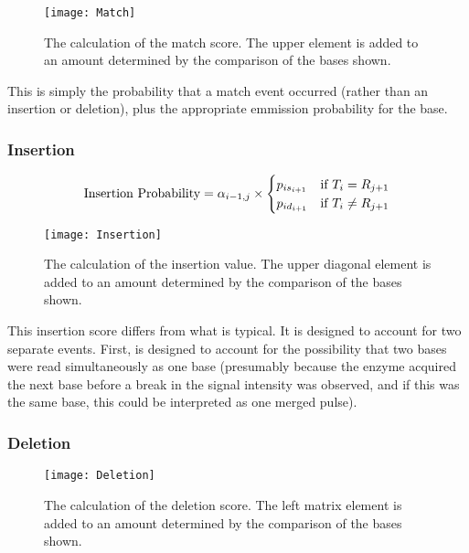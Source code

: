 \documentclass[fleqn,10pt]{SelfArx} %
\begin{document}
\begin{figure}[ht] %
	\texttt{[image: Match]}
		\caption{The calculation of the match score.  The upper element is added to an amount determined by the comparison of the bases shown.}
\end{figure}

This is simply the probability that a match event occurred (rather than an insertion or deletion), plus the appropriate emmission probability for the base.

\subsubsection{\textbf{Insertion}}


\begin{dmath}
\text{Insertion Probability} = \\
	\alpha_{i-1,j}  \times 
	\begin{cases}
		p_{is_{i+1}}  & \text{if }  T_{i} = R_{j+1} \\
		p_{id_{i+1}} & \text{if }  T_{i}  \neq R_{j+1} 
	\end{cases}
\end{dmath}

\begin{figure}[ht] %
	\texttt{[image: Insertion]}
		\caption{The calculation of the insertion value.  The upper diagonal element is added to an amount determined by the comparison of the bases shown.}
\end{figure}


This insertion score differs from what is typical.  It is designed to account for two separate events.  First, is designed to account for the possibility that two bases were read simultaneously as one base (presumably because the enzyme acquired the next base before a break in the signal intensity was observed, and if this was the same base, this could be interpreted as one merged pulse).
 
\subsubsection{\textbf{Deletion}}

\begin{figure}[ht] %
	\texttt{[image: Deletion]}
		\caption{The calculation of the deletion score.  The left matrix element is added to an amount determined by the comparison of the bases shown.}				
\end{figure}
\end{document}
